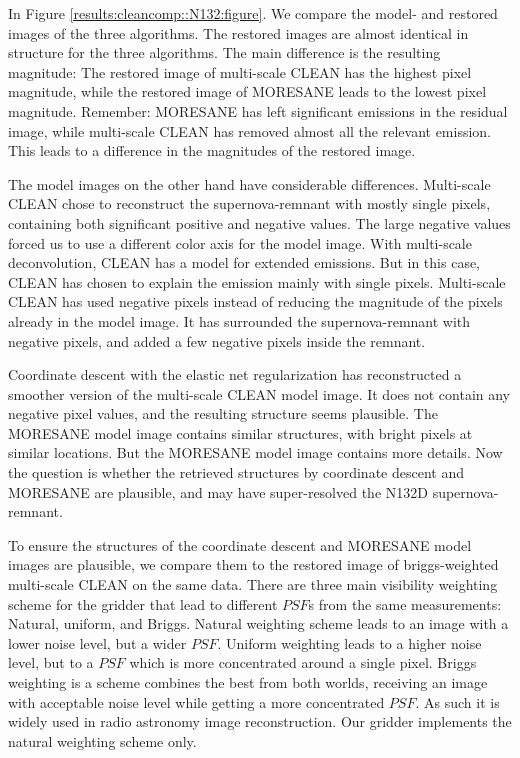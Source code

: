 In Figure \ref{results:cleancomp::N132:figure}. We compare the model- and restored images of the three algorithms. The restored images are almost identical in structure for the three algorithms. The main difference is the resulting magnitude: The restored image of multi-scale CLEAN  has the highest pixel magnitude, while the restored image of MORESANE leads to the lowest pixel magnitude. Remember: MORESANE has left significant emissions in the residual image, while multi-scale CLEAN has removed almost all the relevant emission. This leads to a difference in the magnitudes of the restored image.

The model images on the other hand have considerable differences. Multi-scale CLEAN chose to reconstruct the supernova-remnant with mostly single pixels, containing both significant positive and negative values. The large negative values forced us to use a different color axis for the model image. With multi-scale deconvolution, CLEAN has a model for extended emissions. But in this case, CLEAN has chosen to explain the emission mainly with single pixels. Multi-scale CLEAN has used negative pixels instead of reducing the magnitude of the pixels already in the model image. It has surrounded the supernova-remnant with negative pixels, and added a few negative pixels inside the remnant.

Coordinate descent with the elastic net regularization has reconstructed a smoother version of the multi-scale CLEAN model image. It does not contain any negative pixel values, and the resulting structure seems plausible. The MORESANE model image contains similar structures, with bright pixels at similar locations. But the MORESANE model image contains more details. Now the question is whether the retrieved structures by coordinate descent and MORESANE are plausible, and may have super-resolved the N132D supernova-remnant.

\newpage

To ensure the structures of the coordinate descent and MORESANE model images are plausible, we compare them to the restored image of briggs-weighted multi-scale CLEAN on the same data. There are three main visibility weighting scheme for the gridder that lead to different $PSF$s from the same measurements: Natural, uniform, and Briggs\cite{briggsWeighting}. Natural weighting scheme leads to an image with a lower noise level, but a wider $PSF$. Uniform weighting leads to a higher noise level, but to a $PSF$ which is more concentrated around a single pixel. Briggs weighting is a scheme combines the best from both worlds, receiving an image with acceptable noise level while getting a more concentrated $PSF$. As such it is widely used in radio astronomy image reconstruction. Our gridder implements the natural weighting scheme only.

